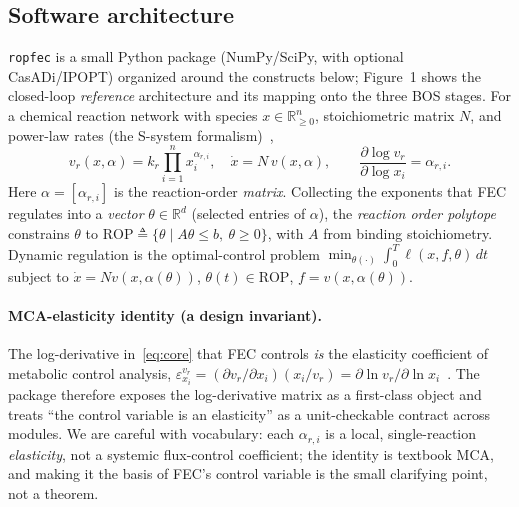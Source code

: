 \documentclass[11pt]{article}
\newcommand{\rop}{\mathrm{ROP}}
\begin{document}
\subsection{Software architecture}
\texttt{ropfec} is a small Python package (NumPy/SciPy, with optional CasADi/IPOPT) organized
around the constructs below; Figure~1 shows the closed-loop \emph{reference}
architecture and its mapping onto the three BOS stages. For a chemical reaction network with
species $x\in\mathbb{R}^n_{\ge0}$, stoichiometric matrix $N$, and power-law
rates (the {S}-system formalism)~\citep{savageau1969,feinberg2019crnt,alon2019systems},
\begin{equation}
v_r(x,\alpha)=k_r\prod_{i=1}^{n}x_i^{\alpha_{r,i}},\quad \dot{x}=N\,v(x,\alpha),\qquad
\frac{\partial\log v_r}{\partial\log x_i}=\alpha_{r,i}.
\label{eq:core}
\end{equation}
Here $\alpha=[\alpha_{r,i}]$ is the reaction-order \emph{matrix}. Collecting the exponents that
FEC regulates into a \emph{vector} $\theta\in\mathbb{R}^d$ (selected entries of $\alpha$), the
\emph{reaction order polytope} constrains $\theta$ to
$\rop\triangleq\{\theta\mid A\theta\le b,\ \theta\ge0\}$, with $A$ from binding stoichiometry.
Dynamic regulation is the optimal-control problem
$\min_{\theta(\cdot)}\int_0^T\ell(x,f,\theta)\,dt$ subject to
$\dot x=Nv(x,\alpha(\theta))$, $\theta(t)\in\rop$, $f=v(x,\alpha(\theta))$.

\paragraph{MCA-elasticity identity (a design invariant).} The log-derivative
in~\eqref{eq:core} that FEC controls \emph{is} the elasticity coefficient of metabolic
control analysis, $\varepsilon^{v_r}_{x_i}=(\partial v_r/\partial x_i)(x_i/v_r)=
\partial\ln v_r/\partial\ln x_i$~\citep{kacser1973control,heinrich1974linear,fell1997understanding}.
The package therefore exposes the log-derivative matrix as a first-class object and treats
``the control variable is an elasticity'' as a unit-checkable contract across modules.
We are careful with vocabulary: each $\alpha_{r,i}$ is a local, single-reaction \emph{elasticity}, not
a systemic flux-control coefficient; the identity is textbook MCA, and making it the basis
of FEC's control variable is the small clarifying point, not a theorem.
\end{document}
